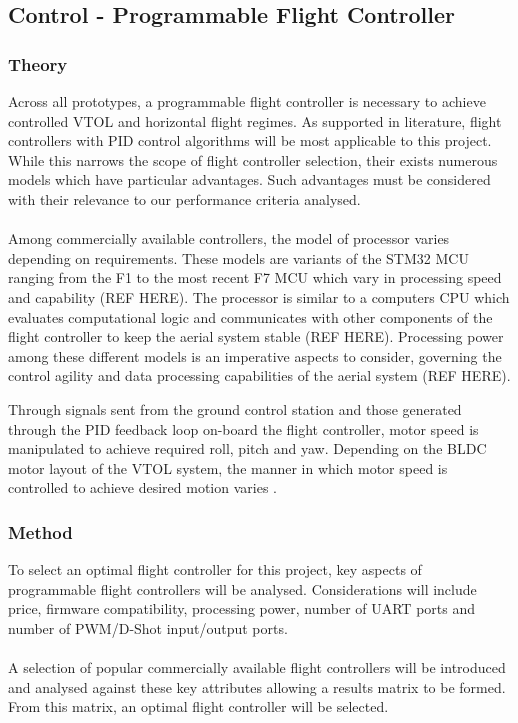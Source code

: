 \subsection{Control - Programmable Flight Controller}

\subsubsection{Theory}
Across all prototypes, a programmable flight controller is necessary to achieve controlled VTOL and horizontal flight regimes. As supported in literature, flight controllers with PID control algorithms will be most applicable to this project. While this narrows the scope of flight controller selection, their exists numerous models which have particular advantages. Such advantages must be considered with their relevance to our performance criteria analysed.\\
\\
Among commercially available controllers, the model of processor varies depending on requirements. These models are variants of the STM32 MCU ranging from the F1 to the most recent F7 MCU which vary in processing speed and capability (REF HERE). The processor is similar to a computers CPU which evaluates computational logic and communicates with other components of the flight controller to keep the aerial system stable (REF HERE). Processing power among these different models is an imperative aspects to consider, governing the control agility and data processing capabilities of the aerial system (REF HERE).  

Through signals sent from the ground control station and those generated through the PID feedback loop on-board the flight controller, motor speed is manipulated to achieve required roll, pitch and yaw\cite{vervoorst2016modular}. Depending on the BLDC motor layout of the VTOL system, the manner in which motor speed is controlled to achieve desired motion varies \cite{vervoorst2016modular}.\\

\subsubsection{Method}

To select an optimal flight controller for this project, key aspects of programmable flight controllers will be analysed. Considerations will include price, firmware compatibility, processing power, number of UART ports and number of PWM/D-Shot input/output ports.\\
\\
A selection of popular commercially available flight controllers will be introduced and analysed against these key attributes allowing a results matrix to be formed. From this matrix, an optimal flight controller will be selected. 
